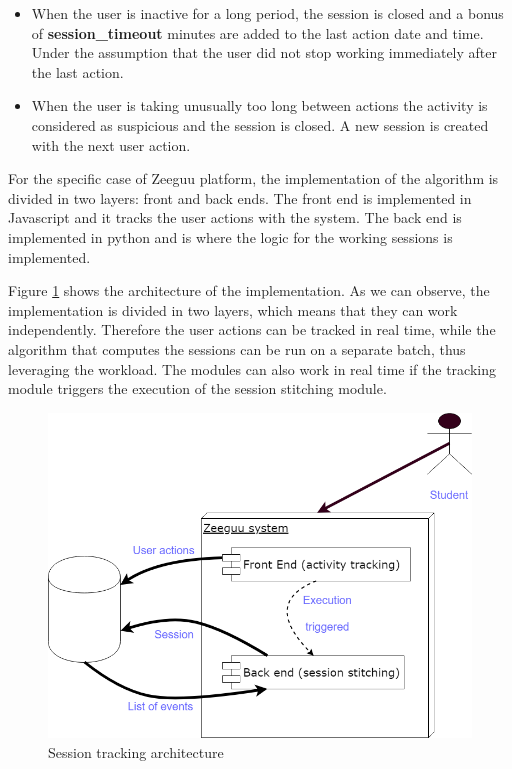 \begin{itemize}
	\item When the user is inactive for a long period, the session is closed and a bonus of \textbf{session\_timeout} minutes are added to the last action date and time. Under the assumption that the user did not stop working immediately after the last action.
	
	\item When the user is taking unusually too long between actions the activity is considered as suspicious and the session is closed. A new session is created with the next user action.
\end{itemize}

For the specific case of Zeeguu platform, the implementation of the algorithm is divided in two layers: front and back ends. The front end is implemented in Javascript and it tracks the user actions with the system. The back end is implemented in python and is where the logic for the working sessions is implemented.

Figure \ref{fig:session_tracking_architecture} shows the architecture of the implementation. As we can observe, the implementation is divided in two layers, which means that they can work independently. Therefore the user actions can be tracked in real time, while the algorithm that computes the sessions can be run on a separate batch, thus leveraging the workload. The modules can also work in real time if the tracking module triggers the execution of the session stitching module.

\begin{figure}[bth]
	\centering
	\includegraphics[width=0.7\linewidth]{gfx/session_tracking_architecture}
	\caption{Session tracking architecture}\label{fig:session_tracking_architecture}
\end{figure}

